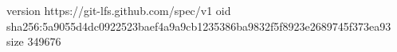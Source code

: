 version https://git-lfs.github.com/spec/v1
oid sha256:5a9055d4dc0922523baef4a9a9cb1235386ba9832f5f8923e2689745f373ea93
size 349676
